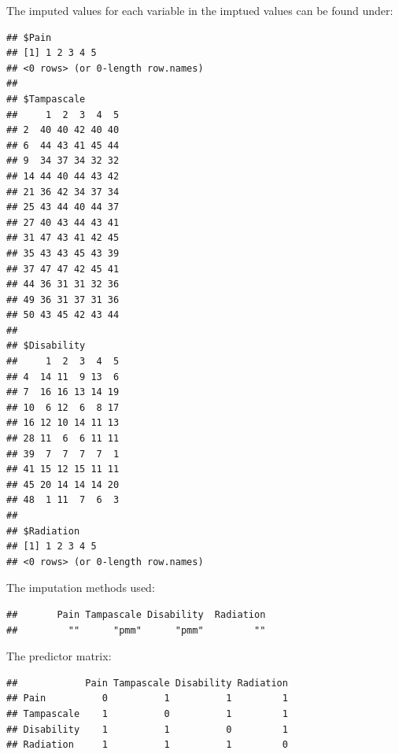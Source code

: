\documentclass[]{book}
\newenvironment{Shaded}{\begin{snugshade}}{\end{snugshade}}
\newcommand{\OperatorTok}[1]{\textcolor[rgb]{0.81,0.36,0.00}{\textbf{#1}}}
\newcommand{\NormalTok}[1]{#1}
\begin{document}
The imputed values for each variable in the imptued values can be found
under:

\begin{Shaded}
\end{Shaded}

\begin{verbatim}
## $Pain
## [1] 1 2 3 4 5
## <0 rows> (or 0-length row.names)
## 
## $Tampascale
##     1  2  3  4  5
## 2  40 40 42 40 40
## 6  44 43 41 45 44
## 9  34 37 34 32 32
## 14 44 40 44 43 42
## 21 36 42 34 37 34
## 25 43 44 40 44 37
## 27 40 43 44 43 41
## 31 47 43 41 42 45
## 35 43 43 45 43 39
## 37 47 47 42 45 41
## 44 36 31 31 32 36
## 49 36 31 37 31 36
## 50 43 45 42 43 44
## 
## $Disability
##     1  2  3  4  5
## 4  14 11  9 13  6
## 7  16 16 13 14 19
## 10  6 12  6  8 17
## 16 12 10 14 11 13
## 28 11  6  6 11 11
## 39  7  7  7  7  1
## 41 15 12 15 11 11
## 45 20 14 14 14 20
## 48  1 11  7  6  3
## 
## $Radiation
## [1] 1 2 3 4 5
## <0 rows> (or 0-length row.names)
\end{verbatim}

The imputation methods used:

\begin{Shaded}
\end{Shaded}

\begin{verbatim}
##       Pain Tampascale Disability  Radiation 
##         ""      "pmm"      "pmm"         ""
\end{verbatim}

The predictor matrix:

\begin{Shaded}
\end{Shaded}

\begin{verbatim}
##            Pain Tampascale Disability Radiation
## Pain          0          1          1         1
## Tampascale    1          0          1         1
## Disability    1          1          0         1
## Radiation     1          1          1         0
\end{verbatim}
\end{document}
